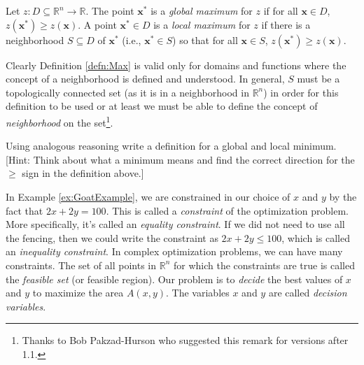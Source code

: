 \begin{definition} Let $z: D \subseteq \mathbb{R}^n \rightarrow \mathbb{R}$. The point $\mathbf{x}^*$ is a \textit{global maximum} for $z$ if for all $\mathbf{x} \in D$, $z(\mathbf{x}^*) \geq z(\mathbf{x})$. 
A point $\mathbf{x}^* \in D$ is a \textit{local maximum} for $z$ if there is a neighborhood $S \subseteq D$ of  $\mathbf{x}^*$  (i.e., $\mathbf{x}^* \in S$) so that for all $\mathbf{x} \in S$, $z(\mathbf{x}^*) \geq z(\mathbf{x})$. 
\label{defn:Max}
\end{definition}

\begin{remark} Clearly Definition \ref{defn:Max} is valid only for domains and functions where the concept of a neighborhood is defined and understood. In general, $S$ must be a topologically connected set (as it is in a neighborhood in $\mathbb{R}^n$) in order for this definition to be used or at least we must be able to define the concept of \textit{neighborhood} on the set\footnote{Thanks to Bob Pakzad-Hurson who suggested this remark for versions after 1.1.}.
\end{remark}

\begin{exercise} Using analogous reasoning write a definition for a global and local minimum. [Hint: Think about what a minimum means and find the correct direction for the $\geq$ sign in the definition above.]
\end{exercise}

In Example \ref{ex:GoatExample}, we are constrained in our choice of $x$ and $y$ by the fact that $2x + 2y = 100$. This is called a \textit{constraint} of the optimization problem. More specifically, it's called an \textit{equality constraint}. If we did not need to use all the fencing, then we could write the constraint as $2x + 2y \leq 100$, which is called an \textit{inequality constraint}. In complex optimization problems, we can have many constraints. The set of all points in $\mathbb{R}^n$ for which the constraints are true is called the \textit{feasible set} (or feasible region). Our problem is to \textit{decide} the best values of $x$ and $y$ to maximize the area $A(x,y)$. The variables $x$ and $y$ are called \textit{decision variables}. 

